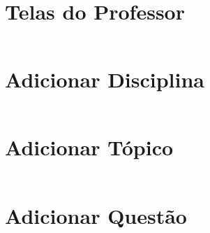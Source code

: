 \documentclass[12pt,oneside,a4paper,article]{abntex2}
\begin{document}
		\pagebreak
		
	\section{Telas do Professor}
		\begin{mdframed}[linecolor=black, topline=true, bottomline=true,leftline=false, rightline=false, backgroundcolor=white,userdefinedwidth=\textwidth]
			\inputminted[linenos=true,numberblanklines=true,showspaces=false,breaklines=true]{html}{Codigos/professor.html}
		\end{mdframed}
		
		\pagebreak
		
	\section{Adicionar Disciplina}
		\begin{mdframed}[linecolor=black, topline=true, bottomline=true,leftline=false, rightline=false, backgroundcolor=white,userdefinedwidth=\textwidth]
			\inputminted[linenos=true,numberblanklines=true,showspaces=false,breaklines=true]{html}{Codigos/disciplina.html}
		\end{mdframed}
		
		\pagebreak
		
	\section{Adicionar Tópico}
		\begin{mdframed}[linecolor=black, topline=true, bottomline=true,leftline=false, rightline=false, backgroundcolor=white,userdefinedwidth=\textwidth]
			\inputminted[linenos=true,numberblanklines=true,showspaces=false,breaklines=true]{html}{Codigos/topico.html}
		\end{mdframed}
		
		\pagebreak
		
	\section{Adicionar Questão}
		\begin{mdframed}[linecolor=black, topline=true, bottomline=true,leftline=false, rightline=false, backgroundcolor=white,userdefinedwidth=\textwidth]
			\inputminted[linenos=true,numberblanklines=true,showspaces=false,breaklines=true]{html}{Codigos/questao.html}
		\end{mdframed}
		
		\pagebreak
		
\end{document}

